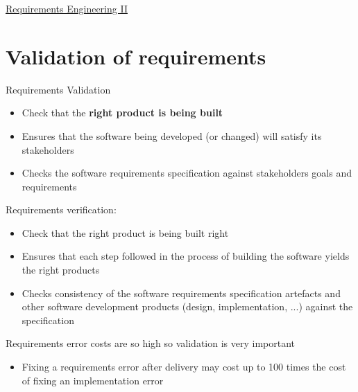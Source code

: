 \documentclass{article}[18pt]
\begin{document}
\begin{center}
\underline{\huge Requirements Engineering II}
\end{center}
\section{Validation of requirements}
\begin{minipage}{0.8\textwidth}

Requirements Validation
\begin{itemize}
	\item Check that the \textbf{right product is being built}
	\item Ensures that the software being developed (or changed) will satisfy its stakeholders
	\item Checks the software requirements specification against stakeholders goals and requirements
\end{itemize}
Requirements verification:
\begin{itemize}
	\item Check that the right product is being built right
	\item Ensures that each step followed in the process of building the software yields the right products
	\item Checks consistency of the software requirements specification artefacts and other software development products (design, implementation, ...) against the specification
\end{itemize}
Requirements error costs are so high so validation is very important
\begin{itemize}
	\item Fixing a requirements error after delivery may cost up to 100 times the cost of fixing an implementation error
\end{itemize}

\end{minipage}
\end{document}
